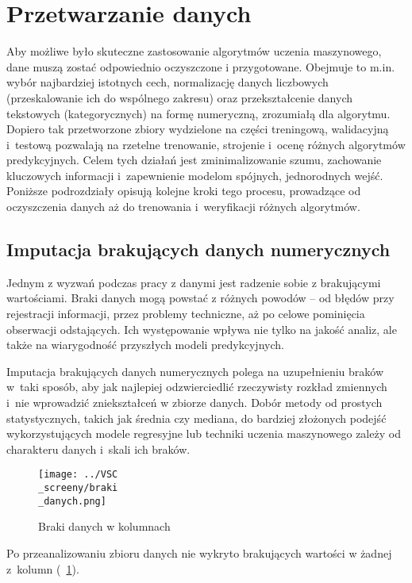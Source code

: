 \documentclass[12pt,a4paper]{report}
\theoremstyle{definition} %
\begin{document}
	\section{Przetwarzanie danych}
	\hspace*{\parindent}Aby możliwe było skuteczne zastosowanie algorytmów uczenia maszynowego, dane muszą zostać odpowiednio oczyszczone i przygotowane. Obejmuje to m.in. wybór najbardziej istotnych cech, normalizację danych liczbowych (przeskalowanie ich do wspólnego zakresu) oraz przekształcenie danych tekstowych (kategorycznych) na formę numeryczną, zrozumiałą dla algorytmu. Dopiero tak przetworzone zbiory wydzielone na części treningową, walidacyjną i~testową pozwalają na rzetelne trenowanie, strojenie i~ocenę różnych algorytmów predykcyjnych. Celem tych działań jest zminimalizowanie szumu, zachowanie kluczowych informacji i~zapewnienie modelom spójnych, jednorodnych wejść. Poniższe podrozdziały opisują kolejne kroki tego procesu, prowadzące od oczyszczenia danych aż do trenowania i~weryfikacji różnych algorytmów.

	\subsection{Imputacja brakujących danych numerycznych}
	\hspace*{\parindent}Jednym z wyzwań podczas pracy z danymi jest radzenie sobie z brakującymi wartościami. Braki danych mogą powstać z różnych powodów – od błędów przy rejestracji informacji, przez problemy techniczne, aż po celowe pominięcia obserwacji odstających. Ich występowanie wpływa nie tylko na jakość analiz, ale także na 				wiarygodność przyszłych modeli predykcyjnych.

	Imputacja brakujących danych numerycznych polega na uzupełnieniu braków w~taki sposób, aby jak najlepiej odzwierciedlić rzeczywisty rozkład zmiennych i~nie wprowadzić zniekształceń w zbiorze danych. Dobór metody od prostych statystycznych, takich jak średnia czy mediana, do bardziej złożonych podejść wykorzystujących modele regresyjne lub 			techniki uczenia maszynowego zależy od charakteru danych i~skali ich braków.  

	\begin{figure}[H]
	    \centering
	    \texttt{[image: ../VSC\\\_screeny/braki\\\_danych.png]} 
	    \caption{Braki danych w kolumnach}
	    \label{fig:brakiDanych}
	\end{figure}
	
	Po przeanalizowaniu zbioru danych nie wykryto brakujących wartości w żadnej z~kolumn (\figurename~\ref{fig:brakiDanych}).
	
\end{document}
